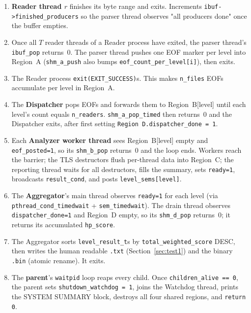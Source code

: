 \documentclass[11pt,a4paper]{article}
\newcommand{\code}[1]{\texttt{\small #1}}
\begin{document}
\begin{enumerate}
    \item \textbf{Reader thread $r$} finishes its byte range and exits.
        Increments \code{ibuf->finished\_producers} so the parser
        thread observes "all producers done" once the buffer empties.

    \item Once all $T$ reader threads of a Reader process have exited,
        the parser thread's \code{ibuf\_pop} returns~0. The parser
        thread pushes one EOF marker per level into Region~A
        (\code{shm\_a\_push} also bumps
        \code{eof\_count\_per\_level[i]}), then exits.

    \item The Reader process \code{exit(EXIT\_SUCCESS)}s. This makes
        \code{n\_files} EOFs accumulate per level in Region~A.

    \item The \textbf{Dispatcher} pops EOFs and forwards them to
        Region~B[level] until each level's count equals
        \code{n\_readers}. \code{shm\_a\_pop\_timed} then returns~0 and
        the Dispatcher exits, after first setting
        \code{Region D.dispatcher\_done = 1}.

    \item Each \textbf{Analyzer worker thread} sees Region~B[level]
        empty and \code{eof\_posted=1}, so its \code{shm\_b\_pop}
        returns~0 and the loop ends. Workers reach the barrier; the
        TLS destructors flush per-thread data into Region~C; the
        reporting thread waits for all destructors, fills the summary,
        sets \code{ready=1}, broadcasts \code{result\_cond}, and posts
        \code{level\_sems[level]}.

    \item The \textbf{Aggregator}'s main thread observes \code{ready=1}
        for each level (via \code{pthread\_cond\_timedwait} +
        \code{sem\_timedwait}). The drain thread observes
        \code{dispatcher\_done=1} and Region~D empty, so its
        \code{shm\_d\_pop} returns~0; it returns its accumulated
        \code{hp\_score}.

    \item The Aggregator sorts \code{level\_result\_t}s by
        \code{total\_weighted\_score} DESC, then writes the human
        readable \code{.txt} (Section~\ref{sec:test1}) and the binary
        \code{.bin} (atomic rename). It exits.

    \item The \textbf{parent}'s \code{waitpid} loop reaps every child.
        Once \code{children\_alive == 0}, the parent sets
        \code{shutdown\_watchdog = 1}, joins the Watchdog thread,
        prints the SYSTEM SUMMARY block, destroys all four shared
        regions, and \code{return 0}.
\end{enumerate}
\end{document}
